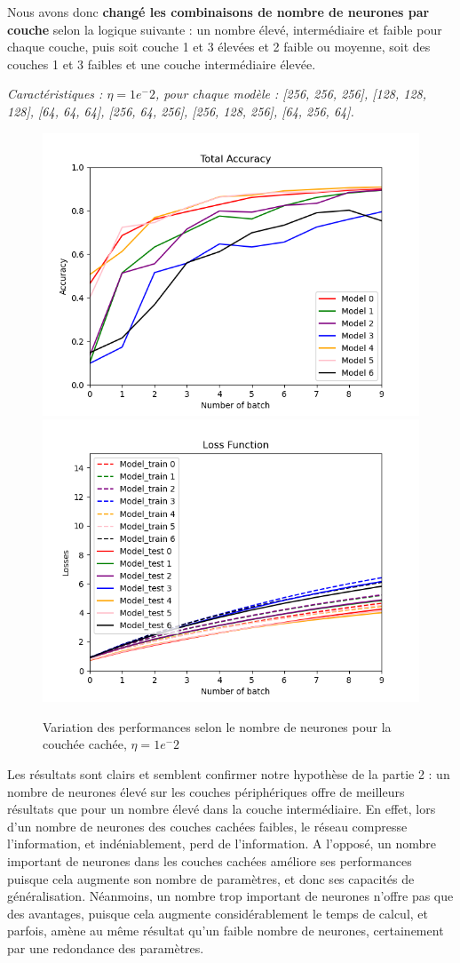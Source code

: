 \documentclass[a4paper]{article}
\begin{document}
	Nous avons donc \textbf{changé les combinaisons de nombre de neurones par couche} selon la logique suivante : un nombre élevé, intermédiaire et faible pour chaque couche, puis soit couche 1 et 3 élevées et 2 faible ou moyenne, soit des couches 1 et 3 faibles et une couche intermédiaire élevée. 

\textit{Caractéristiques : $\eta = 1e^-2$, pour chaque modèle : [256, 256, 256], [128, 128, 128], [64, 64, 64], [256, 64, 256], [256, 128, 256], [64, 256, 64]. }

		\begin{figure}[!ht]
			\centering
			\includegraphics[width=.50\textwidth]{Fig_acc_p3_3C_v2.png}\hfill
			\includegraphics[width=.50\textwidth]{Fig_losses_p3_3C_v2.png}\hfill
			\caption{Variation des performances selon le nombre de neurones pour la couchée cachée, $\eta = 1e^-2$}	
		\end{figure}

Les résultats sont clairs et semblent confirmer notre hypothèse de la partie 2 : un nombre de neurones élevé sur les couches périphériques offre de meilleurs résultats que pour un nombre élevé dans la couche intermédiaire. En effet, lors d'un nombre de neurones des couches cachées faibles, le réseau compresse l'information, et indéniablement, perd de l'information. A l'opposé, un nombre important de neurones dans les couches cachées améliore ses performances puisque cela augmente son nombre de paramètres, et donc ses capacités de généralisation. Néanmoins, un nombre trop important de neurones n'offre pas que des avantages, puisque cela augmente considérablement le temps de calcul, et parfois, amène au même résultat qu'un faible nombre de neurones, certainement par une redondance des paramètres. 
\end{document}
